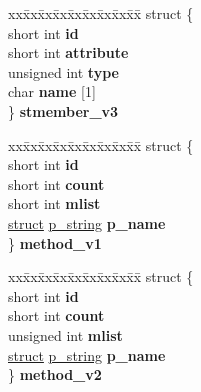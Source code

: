 \begin{DoxyCompactItemize}
\begin{tabbing}
\end{tabbing}\item 
\mbox{\label{unioncodeview__fieldtype_a38ba2de7fb2d5bea0e6a9341469b7d20}} 
\begin{tabbing}
xx\=xx\=xx\=xx\=xx\=xx\=xx\=xx\=xx\=\kill
struct \{\\
\>short int {\bfseries id}\\
\>short int {\bfseries attribute}\\
\>unsigned int {\bfseries type}\\
\>char {\bfseries name} \mbox{[}1\mbox{]}\\
\} {\bfseries stmember\_v3}\\

\end{tabbing}\item 
\mbox{\label{unioncodeview__fieldtype_a3c150be51eb3a75d94fbe1464606d36e}} 
\begin{tabbing}
xx\=xx\=xx\=xx\=xx\=xx\=xx\=xx\=xx\=\kill
struct \{\\
\>short int {\bfseries id}\\
\>short int {\bfseries count}\\
\>short int {\bfseries mlist}\\
\>\hyperlink{interfacestruct}{struct} \hyperlink{structp__string}{p\_string} {\bfseries p\_name}\\
\} {\bfseries method\_v1}\\

\end{tabbing}\item 
\mbox{\label{unioncodeview__fieldtype_ae21487fb1d1d6956c127b6559d40c72d}} 
\begin{tabbing}
xx\=xx\=xx\=xx\=xx\=xx\=xx\=xx\=xx\=\kill
struct \{\\
\>short int {\bfseries id}\\
\>short int {\bfseries count}\\
\>unsigned int {\bfseries mlist}\\
\>\hyperlink{interfacestruct}{struct} \hyperlink{structp__string}{p\_string} {\bfseries p\_name}\\
\} {\bfseries method\_v2}\\


\end{tabbing}
\end{DoxyCompactItemize}
